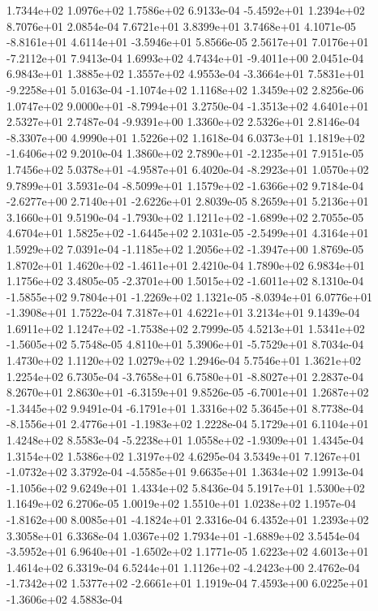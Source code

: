 1.7344e+02 1.0976e+02 1.7586e+02  6.9133e-04
-5.4592e+01  1.2394e+02  8.7076e+01  2.0854e-04
7.6721e+01 3.8399e+01 3.7468e+01  4.1071e-05
-8.8161e+01  4.6114e+01 -3.5946e+01  5.8566e-05
 2.5617e+01  7.0176e+01 -7.2112e+01  7.9413e-04
 1.6993e+02  4.7434e+01 -9.4011e+00  2.0451e-04
6.9843e+01 1.3885e+02 1.3557e+02  4.9553e-04
-3.3664e+01  7.5831e+01 -9.2258e+01  5.0163e-04
-1.1074e+02  1.1168e+02  1.3459e+02  2.8256e-06
 1.0747e+02  9.0000e+01 -8.7994e+01  3.2750e-04
-1.3513e+02  4.6401e+01  2.5327e+01  2.7487e-04
-9.9391e+00  1.3360e+02  2.5326e+01  2.8146e-04
-8.3307e+00  4.9990e+01  1.5226e+02  1.1618e-04
 6.0373e+01  1.1819e+02 -1.6406e+02  9.2010e-04
 1.3860e+02  2.7890e+01 -2.1235e+01  7.9151e-05
 1.7456e+02  5.0378e+01 -4.9587e+01  6.4020e-04
-8.2923e+01  1.0570e+02  9.7899e+01  3.5931e-04
-8.5099e+01  1.1579e+02 -1.6366e+02  9.7184e-04
-2.6277e+00  2.7140e+01 -2.6226e+01  2.8039e-05
8.2659e+01 5.2136e+01 3.1660e+01  9.5190e-04
-1.7930e+02  1.1211e+02 -1.6899e+02  2.7055e-05
 4.6704e+01  1.5825e+02 -1.6445e+02  2.1031e-05
-2.5499e+01  4.3164e+01  1.5929e+02  7.0391e-04
-1.1185e+02  1.2056e+02 -1.3947e+00  1.8769e-05
 1.8702e+01  1.4620e+02 -1.4611e+01  2.4210e-04
1.7890e+02 6.9834e+01 1.1756e+02  3.4805e-05
-2.3701e+00  1.5015e+02 -1.6011e+02  8.1310e-04
-1.5855e+02  9.7804e+01 -1.2269e+02  1.1321e-05
-8.0394e+01  6.0776e+01 -1.3908e+01  1.7522e-04
7.3187e+01 4.6221e+01 3.2134e+01  9.1439e-04
 1.6911e+02  1.1247e+02 -1.7538e+02  2.7999e-05
 4.5213e+01  1.5341e+02 -1.5605e+02  5.7548e-05
 4.8110e+01  5.3906e+01 -5.7529e+01  8.7034e-04
1.4730e+02 1.1120e+02 1.0279e+02  1.2946e-04
5.7546e+01 1.3621e+02 1.2254e+02  6.7305e-04
-3.7658e+01  6.7580e+01 -8.8027e+01  2.2837e-04
 8.2670e+01  2.8630e+01 -6.3159e+01  9.8526e-05
-6.7001e+01  1.2687e+02 -1.3445e+02  9.9491e-04
-6.1791e+01  1.3316e+02  5.3645e+01  8.7738e-04
-8.1556e+01  2.4776e+01 -1.1983e+02  1.2228e-04
5.1729e+01 6.1104e+01 1.4248e+02  8.5583e-04
-5.2238e+01  1.0558e+02 -1.9309e+01  1.4345e-04
1.3154e+02 1.5386e+02 1.3197e+02  4.6295e-04
 3.5349e+01  7.1267e+01 -1.0732e+02  3.3792e-04
-4.5585e+01  9.6635e+01  1.3634e+02  1.9913e-04
-1.1056e+02  9.6249e+01  1.4334e+02  5.8436e-04
5.1917e+01 1.5300e+02 1.1649e+02  6.2706e-05
1.0019e+02 1.5510e+01 1.0238e+02  1.1957e-04
-1.8162e+00  8.0085e+01 -4.1824e+01  2.3316e-04
6.4352e+01 1.2393e+02 3.3058e+01  6.3368e-04
 1.0367e+02  1.7934e+01 -1.6889e+02  3.5454e-04
-3.5952e+01  6.9640e+01 -1.6502e+02  1.1771e-05
1.6223e+02 4.6013e+01 1.4614e+02  6.3319e-04
 6.5244e+01  1.1126e+02 -4.2423e+00  2.4762e-04
-1.7342e+02  1.5377e+02 -2.6661e+01  1.1919e-04
 7.4593e+00  6.0225e+01 -1.3606e+02  4.5883e-04
